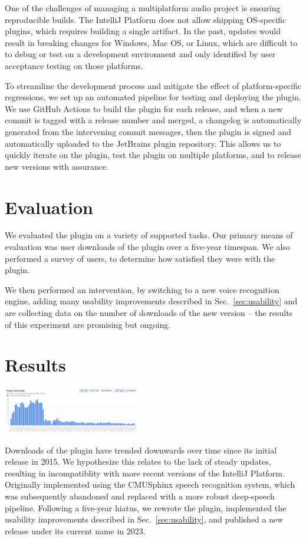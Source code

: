 \documentclass[conference]{IEEEtran}
\begin{document}
One of the challenges of managing a multiplatform audio project is ensuring reproducible builds. The IntelliJ Platform does not allow shipping OS-specific plugins, which requires building a single artifact. In the past, updates would result in breaking changes for Windows, Mac OS, or Linux, which are difficult to to debug or test on a development environment and only identified by user acceptance testing on those platforms.

To streamline the development process and mitigate the effect of platform-specific regressions, we set up an automated pipeline for testing and deploying the plugin. We use GitHub Actions to build the plugin for each release, and when a new commit is tagged with a release number and merged, a changelog is automatically generated from the intervening commit messages, then the plugin is signed and automatically uploaded to the JetBrains plugin repository. This allows us to quickly iterate on the plugin, test the plugin on multiple platforms, and to release new versions with assurance.

\section{Evaluation}

We evaluated the plugin on a variety of supported tasks. Our primary means of evaluation was user downloads of the plugin over a five-year timespan. We also performed a survey of users, to determine how satisfied they were with the plugin.

We then performed an intervention, by switching to a new voice recognition engine, adding many usability improvements described in Sec.~\ref{sec:usability} and are collecting data on the number of downloads of the new version -- the results of this experiment are promising but ongoing.

\section{Results}

\includegraphics[width=0.45\textwidth]{downloads.png}

Downloads of the plugin have trended downwards over time since its initial release in 2015. We hypothesize this relates to the lack of steady updates, resulting in incompatiblity with more recent versions of the IntelliJ Platform. Originally implemented using the CMUSphinx speech recognition system, which was subsequently abandoned and replaced with a more robust deep-speech pipeline. Following a five-year hiatus, we rewrote the plugin, implemented the usability improvements described in Sec.~\ref{sec:usability}, and published a new release under its current name in 2023.
\end{document}
